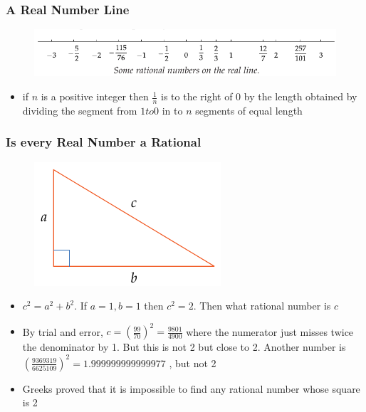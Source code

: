 \documentclass{beamer}
\begin{document}
\begin{frame}
    \frametitle{A Real Number Line}
    \begin{figure}[h]    
        \begin{minipage}[b]{0.8\textwidth}
        \centering
        \includegraphics[scale=0.35]{real-line.png}
    \end{minipage}
\end{figure}
\begin{itemize}
    \item if \( n\) is a positive integer then \( \frac{1}{n}\) is to the right of 0 by the length obtained by dividing the segment from \( 1 to 0\) in to \( n \) segments of equal length
\end{itemize}
\end{frame}
\begin{frame}
    \frametitle{Is every Real Number a Rational}
    \begin{figure}[h]    
        \begin{minipage}[b]{0.8\textwidth}
        \centering
        \includegraphics[scale=0.35]{irrational-geometry.png}
        \end{minipage}
    \end{figure}
    \begin{itemize}
        \item \( c^{2} = a^{2} + b^{2} \). If \( a = 1, b = 1\) then \(c^{2} = 2 \). Then what rational number is \( c \)
        \item By trial and error, \( c = \left( \frac{99}{70} \right)^{2}  = \frac{9801}{4900}\) where the numerator just misses twice the denominator by 1. But this is not 2 but close to 2. Another number is \( \left( \frac{9369319}{6625109} \right)^{2} = 1.999999999999977\) , but not 2
        \item Greeks proved that it is impossible to find any rational number whose square is 2
    \end{itemize} 
\end{frame}
\end{document}
